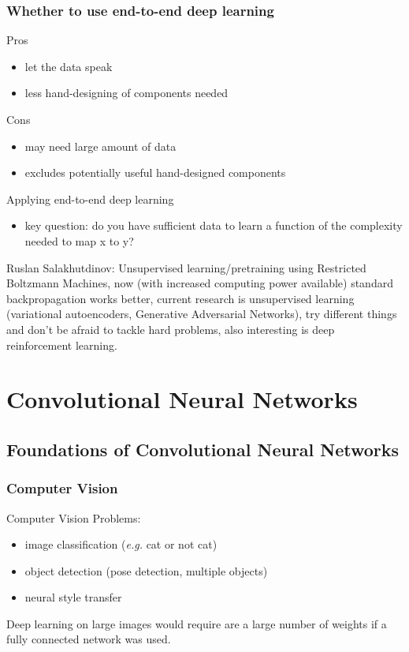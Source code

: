 \documentclass{article}
\begin{document}
\subsubsection{Whether to use end-to-end deep learning}
Pros
\begin{itemize}
  \item let the data speak
  \item less hand-designing of components needed
\end{itemize}
Cons
\begin{itemize}
  \item may need large amount of data
  \item excludes potentially useful hand-designed components
\end{itemize}
Applying end-to-end deep learning
\begin{itemize}
  \item key question: do you have sufficient data to learn a function of the complexity needed to map x to y?
\end{itemize}

Ruslan Salakhutdinov: Unsupervised learning/pretraining using Restricted Boltzmann Machines,
now (with increased computing power available) standard backpropagation works better,
current research is unsupervised learning (variational autoencoders, Generative Adversarial Networks),
try different things and don't be afraid to tackle hard problems, also interesting is deep reinforcement learning.

\section{Convolutional Neural Networks}
\subsection{Foundations of Convolutional Neural Networks}
\subsubsection{Computer Vision}
Computer Vision Problems:
\begin{itemize}
  \item image classification (\emph{e.g.} cat or not cat)
  \item object detection (pose detection, multiple objects)
  \item neural style transfer
\end{itemize}
Deep learning on large images would require are a large number of weights if a fully connected network was used.
\end{document}

